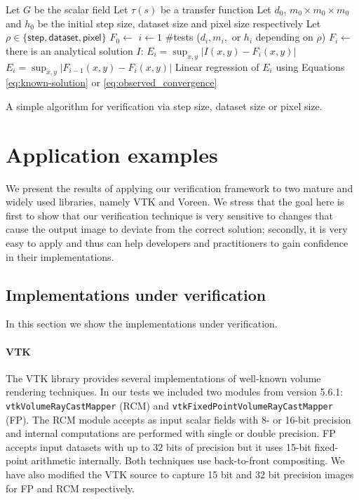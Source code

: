 \begin{algorithm}[b]
\begin{codebox}
\li \Comment Let $G$ be the scalar field
\li \Comment Let $\tau(s)$ be a transfer function
\li \Comment Let $d_0$, $m_0 \times m_0 \times m_0$ and $h_0$ be the initial step size,
\zi  dataset size and pixel size respectively
\li \Comment Let  $\rho \in \{ \textsf{step}, \textsf{dataset}, \textsf{pixel} \}$
\li $F_0 \gets$ 
\li \For $i \gets 1$ \To $\#$tests
\li     \Do {}($d_i, m_i, \text{ or } h_i$ depending on $\rho$)
\li         $F_i \gets$ 
\li         \If there is an analytical solution $I$:
\li            \Then $E_i = \sup_{x,y} | I(x,y) - F_{i}(x,y)|$
\li         \Else  $E_i = \sup_{x,y} | F_{i-1}(x,y) - F_{i}(x,y)|$
            \End
       \End
\li Linear regression of $E_i$ using Equations
\eqref{eq:known-solution} or \eqref{eq:observed_convergence}
\end{codebox}
\caption{A simple algorithm for verification via step size, dataset
  size or pixel size.}
\label{alg:verification-procedure}
\end{algorithm}


\section{Application examples}
\label{chap5:sec:results}

We present the results of applying our verification framework to two
mature and widely used libraries, namely VTK and Voreen. We stress
that the goal here is first to show that our verification technique is
very sensitive to changes that cause the output image to deviate from
the correct solution; secondly, it is very easy to apply and thus can
help developers and practitioners to gain confidence in their
implementations.

\subsection{Implementations under verification}

In this section we show the implementations under verification.

\paragraph*{VTK} 
The VTK library provides several implementations of well-known volume
rendering techniques. In our tests we included two modules from
version 5.6.1: \texttt{vtk\-Volume\-Ray\-Cast\-Mapper} (RCM) and
\texttt{vtkFixedPointVolumeRayCastMapper} (FP).  The RCM module
accepts as input scalar fields with 8- or 16-bit precision and internal
computations are performed with single or double precision.  FP
accepts input datasets with up to 32 bits of precision but it uses 15-bit
fixed-point arithmetic internally.  Both techniques use
back-to-front compositing. We have also modified the VTK source to
capture 15 bit and 32 bit precision images for FP and RCM
respectively.


